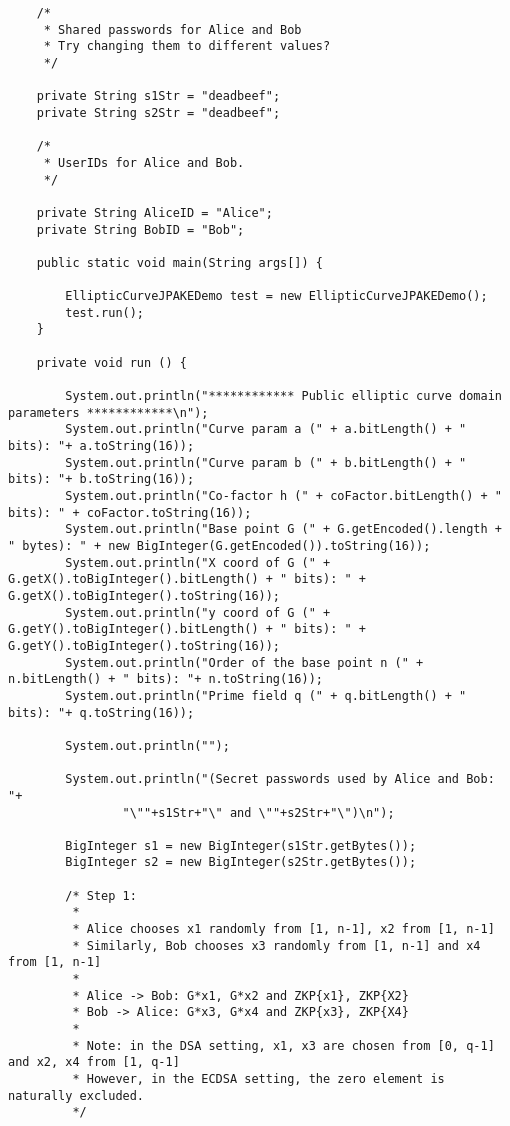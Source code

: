 \documentclass[../PFC.tex]{subfiles}
\begin{document}
\begin{lstlisting}
	/* 
	 * Shared passwords for Alice and Bob 
	 * Try changing them to different values? 
	 */
	
	private String s1Str = "deadbeef";
	private String s2Str = "deadbeef";

	/* 
	 * UserIDs for Alice and Bob.
	 */
	
	private String AliceID = "Alice";
	private String BobID = "Bob";

    public static void main(String args[]) {

    	EllipticCurveJPAKEDemo test = new EllipticCurveJPAKEDemo();
    	test.run();
    }

    private void run () {
	
    	System.out.println("************ Public elliptic curve domain parameters ************\n");
    	System.out.println("Curve param a (" + a.bitLength() + " bits): "+ a.toString(16));
    	System.out.println("Curve param b (" + b.bitLength() + " bits): "+ b.toString(16));    	    	
    	System.out.println("Co-factor h (" + coFactor.bitLength() + " bits): " + coFactor.toString(16));
    	System.out.println("Base point G (" + G.getEncoded().length + " bytes): " + new BigInteger(G.getEncoded()).toString(16));
    	System.out.println("X coord of G (" + G.getX().toBigInteger().bitLength() + " bits): " + G.getX().toBigInteger().toString(16));
    	System.out.println("y coord of G (" + G.getY().toBigInteger().bitLength() + " bits): " + G.getY().toBigInteger().toString(16));
    	System.out.println("Order of the base point n (" + n.bitLength() + " bits): "+ n.toString(16));
    	System.out.println("Prime field q (" + q.bitLength() + " bits): "+ q.toString(16));
    	
    	System.out.println("");
    	
    	System.out.println("(Secret passwords used by Alice and Bob: "+
    			"\""+s1Str+"\" and \""+s2Str+"\")\n");
    	
    	BigInteger s1 = new BigInteger(s1Str.getBytes());
    	BigInteger s2 = new BigInteger(s2Str.getBytes());

    	/* Step 1:  
    	 * 
    	 * Alice chooses x1 randomly from [1, n-1], x2 from [1, n-1]
    	 * Similarly, Bob chooses x3 randomly from [1, n-1] and x4 from [1, n-1]
    	 * 
    	 * Alice -> Bob: G*x1, G*x2 and ZKP{x1}, ZKP{X2}
    	 * Bob -> Alice: G*x3, G*x4 and ZKP{x3}, ZKP{X4}   
    	 * 
    	 * Note: in the DSA setting, x1, x3 are chosen from [0, q-1] and x2, x4 from [1, q-1]
    	 * However, in the ECDSA setting, the zero element is naturally excluded.
    	 */
    	    	

\end{lstlisting}
\end{document}
